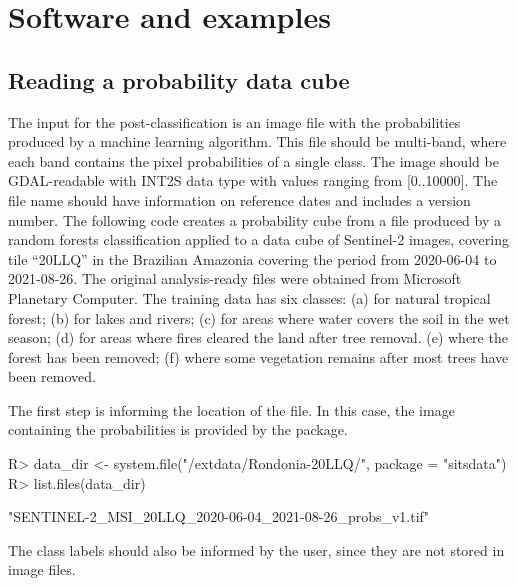 \documentclass[
]{jss}
\begin{document}
\hypertarget{software-and-examples}{%
\section{Software and examples}\label{software-and-examples}}

\hypertarget{reading-a-probability-data-cube}{%
\subsection{Reading a probability data cube}\label{reading-a-probability-data-cube}}

The input for the  post-classification is an image file with the probabilities produced by a machine learning algorithm. This file should be multi-band, where each band contains the pixel probabilities of a single class. The image should be GDAL-readable with INT2S data type with values ranging from {[}0..10000{]}. The file name should have information on reference dates and includes a version number. The following code creates a probability cube from a file produced by a random forests classification applied to a data cube of Sentinel-2 images, covering tile ``20LLQ'' in the Brazilian Amazonia covering the period from 2020-06-04 to 2021-08-26. The original analysis-ready files were obtained from Microsoft Planetary Computer. The training data has six classes: (a)  for natural tropical forest; (b)  for lakes and rivers; (c)  for areas where water covers the soil in the wet season; (d)  for areas where fires cleared the land after tree removal. (e)  where the forest has been removed; (f)  where some vegetation remains after most trees have been removed.

The first step is informing the location of the file. In this case, the image containing
the probabilities is provided by the  package.

\begin{CodeChunk}
\begin{CodeInput}
R> data_dir <- system.file("/extdata/Rondonia-20LLQ/", package = "sitsdata")
R> list.files(data_dir)
\end{CodeInput}
\begin{CodeOutput}
[1] "SENTINEL-2_MSI_20LLQ_2020-06-04_2021-08-26_probs_v1.tif"
\end{CodeOutput}
\end{CodeChunk}

The class labels should also be informed by the user, since they are not stored in image files.
\end{document}

